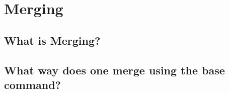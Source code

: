 \chapter{Merging}
\section{What is Merging?}
\section{What way does one merge using the base command?}